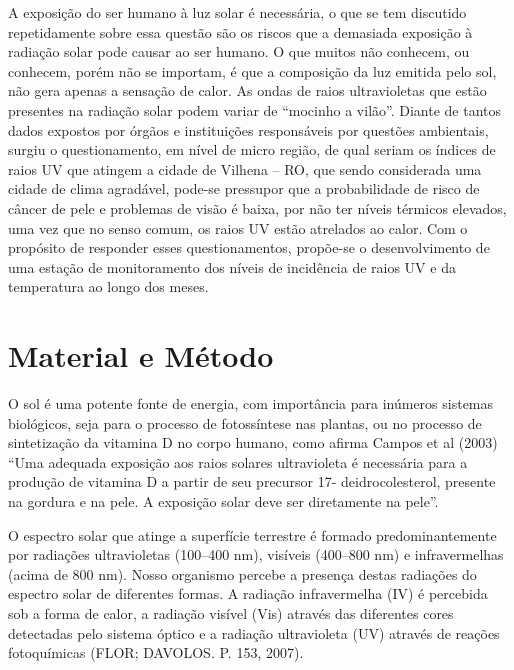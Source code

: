\documentclass[article,12pt,onesidea,4paper,english,brazil]{abntex2}
\begin{document}
	A exposição do ser humano à luz solar é necessária, o que se tem discutido repetidamente sobre essa questão são os riscos que a demasiada exposição à radiação solar pode causar ao ser humano. O que muitos não conhecem, ou conhecem, porém não se importam, é que a composição da luz emitida pelo sol, não gera apenas a sensação de calor. As ondas de raios ultravioletas que estão presentes na radiação solar podem variar de “mocinho a vilão”.
	Diante de tantos dados expostos por órgãos e instituições responsáveis por questões ambientais, surgiu o questionamento, em nível de micro região, de qual seriam os índices de raios UV que atingem a cidade de Vilhena – RO, que sendo considerada uma cidade de clima agradável, pode-se pressupor que a probabilidade de risco de câncer de pele e problemas de visão é baixa, por não ter níveis térmicos elevados, uma vez que no senso comum, os raios UV estão atrelados ao calor.
	Com o propósito de responder esses questionamentos, propõe-se o desenvolvimento de uma estação de monitoramento dos níveis de incidência de raios UV e da temperatura ao longo dos meses.
	
	\section*{Material e Método}
	
O sol é uma potente fonte de energia, com importância para inúmeros sistemas biológicos, seja para o processo de fotossíntese nas plantas, ou no processo de sintetização da vitamina D no corpo humano, como afirma Campos et al (2003) “Uma adequada exposição aos raios solares ultravioleta é necessária para a produção de vitamina D a partir de seu precursor 17- deidrocolesterol, presente na gordura e na pele. A exposição solar deve ser diretamente na pele”. 

\begin{citacao}
	O espectro solar que atinge a superfície terrestre é formado predominantemente por radiações ultravioletas (100–400 nm), visíveis (400–800 nm) e infravermelhas (acima de 800 nm). Nosso organismo percebe a presença destas radiações do espectro solar de diferentes formas. A radiação infravermelha (IV) é percebida sob a forma de calor, a radiação visível (Vis) através das diferentes cores detectadas pelo sistema óptico e a radiação ultravioleta (UV) através de reações fotoquímicas (FLOR; DAVOLOS. P. 153, 2007).
\end{citacao}
	
\end{document}
